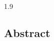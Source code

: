\documentclass[12pt,english]{article} %
\begin{document}
\begin{linenumbers}
\begin{spacing}{1.9}
\begin{flushleft}


\section*{Abstract} %


\end{flushleft}
\end{spacing}
\end{linenumbers}
\end{document}
